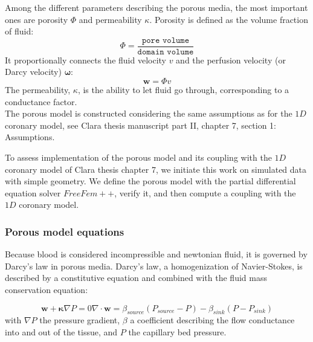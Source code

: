 \documentclass[a4paper, 11pt]{article} %
\begin{document}
Among the different parameters describing the porous media, the most important ones are porosity $\Phi$ and permeability $\kappa$.
Porosity is defined as the volume fraction of fluid:
\begin{equation}
\Phi = \frac{\texttt{pore volume}}{\texttt{domain volume}}
\end{equation}
It proportionally connects the fluid velocity $v$ and the perfusion velocity (or Darcy velocity) $\bm{\omega}$:
\begin{equation}
\bm{w} = \Phi v 
\end{equation}
The permeability, $\kappa$, is the ability to let fluid go through, corresponding to a conductance factor.
\\
 

The porous model is constructed considering the same assumptions as for the $1D$ coronary model, see Clara thesis manuscript part II, chapter 7, section 1: Assumptions.

To assess implementation of the porous model and its coupling with the $1D$ coronary model of Clara thesis chapter 7, we initiate this work on simulated data with simple geometry.
We define the porous model with the partial differential equation solver $FreeFem++$, verify it, and then compute a coupling with the $1D$ coronary model.

\subsubsection{Porous model equations}
\label{sec:porousmodel}
Because blood is considered incompressible and newtonian fluid, it is governed by Darcy's law in porous media. 
Darcy's law, a homogenization of Navier-Stokes, is described by a constitutive equation and combined with the fluid mass conservation equation:

\begin{subequations}
\begin{equation}\label{eq:constiDarcy}
\bm{w} + \bm{\kappa} \nabla P = 0
\end{equation}
\begin{equation}\label{eq:conservDarcy}
\nabla \cdot \bm{w} = \beta_{source} \left(P_{source} - P\right) - \beta_{sink} \left(P - P_{sink}\right)
\end{equation}
\end{subequations}
with $\nabla P$ the pressure gradient, $\beta$ a coefficient describing the flow conductance into and out of the tissue, and $P$ the capillary bed pressure. %
\end{document}
